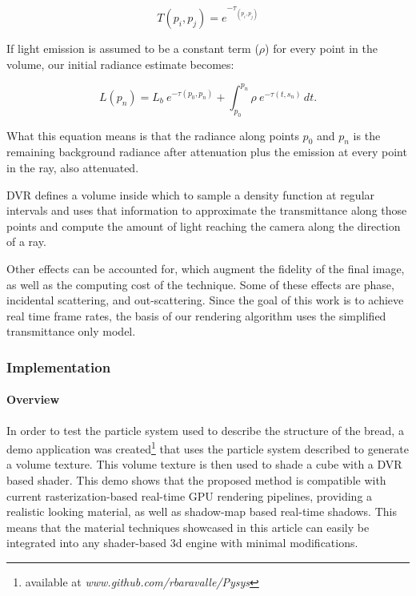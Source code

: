 \documentclass[oneside,a4paper,english,links]{amca}
\begin{document}
\begin{equation} \label{eq:general_radiance}  
  T(p_i,p_j) = e^{-\tau_{(p_i, p_j)}}
\end{equation}

If light emission is assumed to be a constant term ($\rho$) for
every point in the volume, our initial radiance estimate becomes:

\begin{equation} \label{eq:ray_radiance}  
  L(p_n) = L_b \ e^{-\tau(p_0, p_n)} + \int_{p_0}^{p_n} \rho \ e^{-\tau(t,s_n)} \, dt.
\end{equation}

What this equation means is that the radiance along points $p_0$ and
$p_n$ is the remaining background radiance after attenuation plus the
emission at every point in the ray, also attenuated.

DVR defines a volume inside which to sample a density function at
regular intervals and uses that information to approximate the
transmittance along those points and compute the amount of light
reaching the camera along the direction of a ray. 

Other effects can be accounted for, which augment the fidelity of the
final image, as well as the computing cost of the technique. Some of
these effects are phase, incidental scattering, and
out-scattering. Since the goal of this work is to achieve real time
frame rates, the basis of our rendering algorithm uses the simplified
transmittance only model.

\subsubsection{Implementation}

\paragraph{Overview}

In order to test the particle system used to describe the structure of
the bread, a demo application was created\footnote{available at
  \emph{www.github.com/rbaravalle/Pysys}} that uses the particle
system described to generate a volume texture. This volume texture is
then used to shade a cube with a DVR based shader. This demo shows
that the proposed method is compatible with current
rasterization-based real-time GPU rendering pipelines, providing a
realistic looking material, as well as shadow-map based real-time
shadows. This means that the material techniques showcased in this
article  can easily be integrated into any shader-based 3d engine with
minimal modifications.
\end{document}
